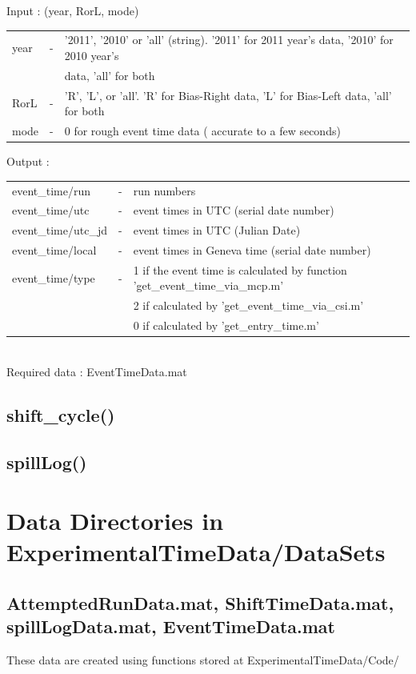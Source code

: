 \documentclass[12pt]{report}
\begin{document}
\noindent
Input : (year, RorL, mode)\\
\begin{tabular}{lcl}
year & - & '2011', '2010' or 'all' (string). '2011' for 2011 year's data, '2010' for 2010 year's \\
& & data, 'all' for both\\
RorL & - & 'R', 'L', or 'all'. 'R' for Bias-Right data, 'L' for Bias-Left data, 'all' for both\\
mode & - & 0 for rough event time data ( accurate to a few seconds)\\
\end{tabular}
Output : \\
\begin{tabular}{lcl}
event\_time/run & - & run numbers\\
event\_time/utc & - &   event times in UTC (serial date number)\\
event\_time/utc\_jd & - & event times in UTC (Julian Date)\\
event\_time/local & - &  event times in Geneva time (serial date number)\\
event\_time/type & - & 1 if the event time is calculated by function 'get\_event\_time\_via\_mcp.m' \\
& & 2 if calculated by 'get\_event\_time\_via\_csi.m'\\
& & 0 if calculated by 'get\_entry\_time.m'\\
\end{tabular}\\
Required data : EventTimeData.mat\\

\section{shift\_cycle()}
\label{sec:shift}

\section{spillLog()}
\label{sec:spillLog}




\chapter{Data Directories in ExperimentalTimeData/DataSets}
\section{AttemptedRunData.mat, ShiftTimeData.mat, spillLogData.mat, EventTimeData.mat}
These data are created using functions stored at ExperimentalTimeData/Code/
\end{document}
